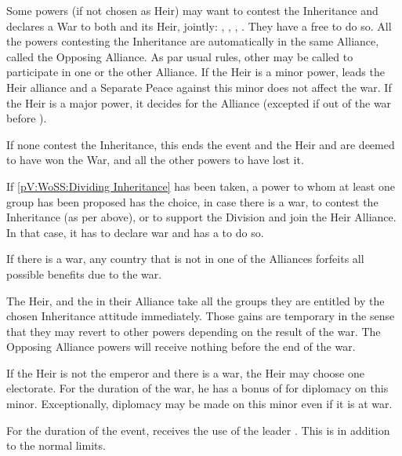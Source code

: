 \begin{digressions}



  \phdipl
  \aparag Some powers (if not chosen as Heir) may want to contest the
  Inheritance and declares a War to both \SPA and its Heir, jointly: \HOL,
  \FRA, \AUS, \ENG.
  \bparag They have a free \CB to do so.
  \bparag All the powers contesting the Inheritance are automatically in the
  same Alliance, called the Opposing Alliance.
  \bparag As par usual rules, other \MAJ may be called to participate in one
  or the other Alliance.
  \bparag If the Heir is a minor power, \SPA leads the Heir alliance and a
  Separate Peace against this minor does not affect the war.
  \bparag If the Heir is a major power, it decides for the Alliance (excepted
  if out of the war before \SPA).

  \aparag If none contest the Inheritance, this ends the event and the Heir
  and \SPA are deemed to have won the War, and all the other powers to have
  lost it.

  \aparag If \ref{pV:WoSS:Dividing Inheritance} has been taken, a power to
  whom at least one group has been proposed has the choice, in case there is a
  war, to contest the Inheritance (as per above), or to support the Division
  and join the Heir Alliance. In that case, it has to declare war and has a
  \CB to do so.

  \aparag If there is a war, any country that is not in one of the Alliances
  forfeits all possible benefits due to the war.

  \aparag The Heir, \SPA and the \MAJ in their Alliance take all the groups
  they are entitled by the chosen Inheritance attitude immediately. Those
  gains are temporary in the sense that they may revert to other powers
  depending on the result of the war. The Opposing Alliance powers will
  receive nothing before the end of the war.

   If the Heir is not the emperor
  and there is a war, the Heir may choose one electorate. For the duration of
  the war, he has a bonus of  for diplomacy on this
  minor. Exceptionally, diplomacy may be made on this minor even if it is at
  war.

  \phadm
  \aparag For the duration of the event, \ENG receives the use of the leader
  . This is in addition to the normal limits.



\end{digressions}
